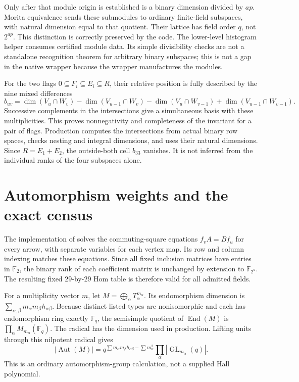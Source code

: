 \documentclass[11pt]{article}
\newcommand{\F}{\mathbb F}
\newcommand{\End}{\operatorname{End}}
\newcommand{\Aut}{\operatorname{Aut}}
\newcommand{\GL}{\operatorname{GL}}
\begin{document}
Only after that module origin is established is a binary dimension divided
by $ap$. Morita equivalence sends these submodules to ordinary finite-field
subspaces, with natural dimension equal to that quotient. Their lattice
has field order $q$, not $2^{ap}$. This distinction is correctly preserved
by the code. The lower-level histogram helper consumes certified module
data. Its simple divisibility checks are not a standalone recognition
theorem for arbitrary binary subspaces; this is not a gap in the native
wrapper because the wrapper manufactures the modules.

For the two flags $0\subseteq F_i\subseteq E_i\subseteq R$, their
relative position is fully described by the nine mixed differences
\[
 b_{uv}=\dim(V_u\cap W_v)-\dim(V_{u-1}\cap W_v)
       -\dim(V_u\cap W_{v-1})+\dim(V_{u-1}\cap W_{v-1}).
\]
Successive complements in the intersections give a simultaneous basis
with these multiplicities. This proves nonnegativity and completeness of
the invariant for a pair of flags. Production computes the intersections
from actual binary row spaces, checks nesting and integral dimensions,
and uses their natural dimensions. Since $R=E_1+E_2$, the outside-both
cell $b_{33}$ vanishes. It is not inferred from the individual ranks of
the four subspaces alone.

\section{Automorphism weights and the exact census}
The implementation of  solves the commuting-square
equations $f_vA=Bf_u$ for every arrow, with separate variables for each
vertex map. Its row and column indexing matches these equations. Since
all fixed inclusion matrices have entries in $\F_2$, the binary rank
of each coefficient matrix is unchanged by extension to $\F_{2^a}$.
The resulting fixed $29$-by-$29$ Hom table is therefore valid for all
admitted fields.

For a multiplicity vector $m$, let $M=\bigoplus_\alpha T_\alpha^{m_\alpha}$.
Its endomorphism dimension is
$\sum_{\alpha,\beta}m_\alpha m_\beta h_{\alpha\beta}$.
Because distinct listed types are nonisomorphic and each has endomorphism
ring exactly $\F_q$, the semisimple quotient of $\End(M)$ is
$\prod_\alpha M_{m_\alpha}(\F_q)$. The radical has the dimension
used in production. Lifting units through this nilpotent radical gives
\[
 |\Aut(M)|=
 q^{\sum m_\alpha m_\beta h_{\alpha\beta}-\sum m_\alpha^2}
 \prod_\alpha |\GL_{m_\alpha}(q)|.
\]
This is an ordinary automorphism-group calculation, not a supplied
Hall polynomial.
\end{document}
